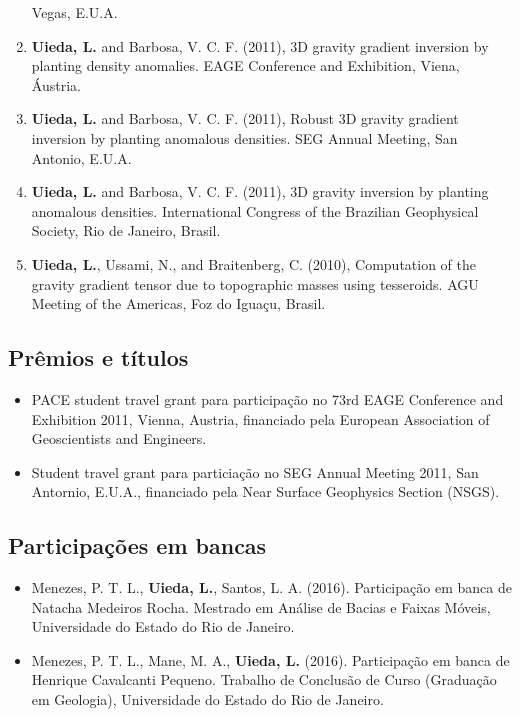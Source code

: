 \begin{enumerate}
    Vegas, E.U.A.
\item \textbf{Uieda, L.} and Barbosa, V. C. F. (2011), 3D gravity gradient
    inversion by planting density anomalies. EAGE Conference and Exhibition,
    Viena, Áustria.
\item \textbf{Uieda, L.} and Barbosa, V. C. F. (2011), Robust 3D gravity
    gradient inversion by planting anomalous densities. SEG Annual Meeting, San
    Antonio, E.U.A.
\item \textbf{Uieda, L.} and Barbosa, V. C. F. (2011), 3D gravity inversion by
    planting anomalous densities. International Congress of the Brazilian
    Geophysical Society, Rio de Janeiro, Brasil.
\item \textbf{Uieda, L.}, Ussami, N., and Braitenberg, C. (2010), Computation
    of the gravity gradient tensor due to topographic masses using tesseroids.
    AGU Meeting of the Americas, Foz do Iguaçu, Brasil.
\end{enumerate}


\subsection{Prêmios e títulos}

\begin{itemize}
\item PACE student travel grant para participação no 73rd EAGE Conference and
    Exhibition 2011, Vienna, Austria, financiado pela European Association of
    Geoscientists and Engineers.
\item Student travel grant para particiação no SEG Annual Meeting 2011, San
    Antornio, E.U.A., financiado pela Near Surface Geophysics Section (NSGS).
\end{itemize}


\subsection{Participações em bancas}

\begin{itemize}
\item Menezes, P. T. L., \textbf{Uieda, L.}, Santos, L. A. (2016).
    Participação em banca de Natacha Medeiros Rocha. Mestrado em Análise de
    Bacias e Faixas Móveis, Universidade do Estado do Rio de Janeiro.
\item Menezes, P. T. L., Mane, M. A., \textbf{Uieda, L.} (2016).  Participação
    em banca de Henrique Cavalcanti Pequeno. Trabalho de Conclusão de Curso
    (Graduação em Geologia), Universidade do Estado do Rio de Janeiro.
\end{itemize}


